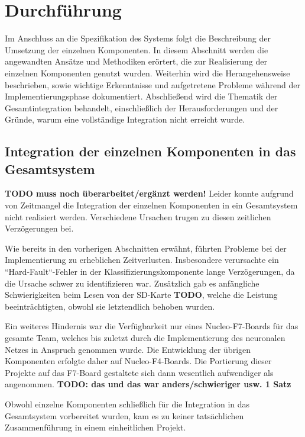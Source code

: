 \newpage
\section{Durchführung}
Im Anschluss an die Spezifikation des Systems folgt die Beschreibung der Umsetzung der einzelnen Komponenten. In diesem Abschnitt werden die angewandten Ansätze und Methodiken erörtert, die zur Realisierung der einzelnen Komponenten genutzt wurden. Weiterhin wird die Herangehensweise beschrieben, sowie wichtige Erkenntnisse und aufgetretene Probleme während der Implementierungsphase dokumentiert. Abschließend wird die Thematik der Gesamtintegration behandelt, einschließlich der Herausforderungen und der Gründe, warum eine vollständige Integration nicht erreicht wurde.







\subsection{Integration der einzelnen Komponenten in das Gesamtsystem}
\label{sec:no-gesamtintegration}

\textbf{TODO muss noch überarbeitet/ergänzt werden!}
Leider konnte aufgrund von Zeitmangel die Integration der einzelnen Komponenten in ein Gesamtsystem nicht realisiert werden. Verschiedene Ursachen trugen zu diesen zeitlichen Verzögerungen bei.

Wie bereits in den vorherigen Abschnitten erwähnt, führten Probleme bei der Implementierung zu erheblichen Zeitverlusten. Insbesondere verursachte ein ``Hard-Fault``-Fehler in der Klassifizierungskomponente lange Verzögerungen, da die Ursache schwer zu identifizieren war. Zusätzlich gab es anfängliche Schwierigkeiten beim Lesen von der SD-Karte \textbf{TODO}, welche die Leistung beeinträchtigten, obwohl sie letztendlich behoben wurden.

Ein weiteres Hindernis war die Verfügbarkeit nur eines Nucleo-F7-Boards für das gesamte Team, welches bis zuletzt durch die Implementierung des neuronalen Netzes in Anspruch genommen wurde. Die Entwicklung der übrigen Komponenten erfolgte daher auf Nucleo-F4-Boards. Die Portierung dieser Projekte auf das F7-Board gestaltete sich dann wesentlich aufwendiger als angenommen. \textbf{TODO: das und das war anders/schwieriger usw. 1 Satz}

Obwohl einzelne Komponenten schließlich für die Integration in das Gesamtsystem vorbereitet wurden, kam es zu keiner tatsächlichen Zusammenführung in einem einheitlichen Projekt.



